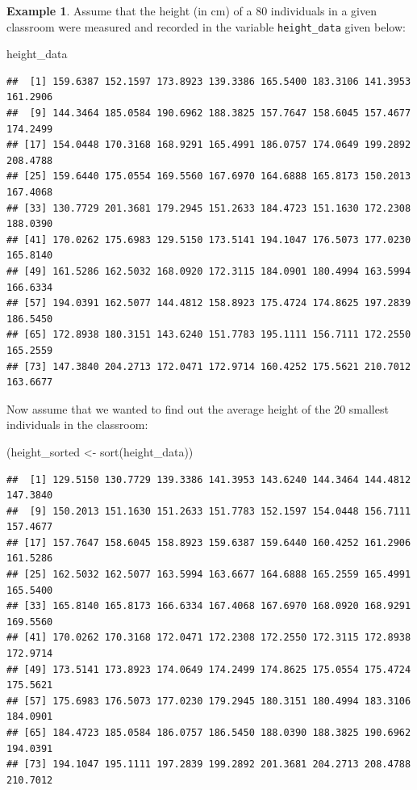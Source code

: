 \documentclass[
]{book}
\newenvironment{Shaded}{\begin{snugshade}}{\end{snugshade}}
\newcommand{\FunctionTok}[1]{\textcolor[rgb]{0.00,0.00,0.00}{#1}}
\newcommand{\NormalTok}[1]{#1}
\newcommand{\OtherTok}[1]{\textcolor[rgb]{0.56,0.35,0.01}{#1}}
\theoremstyle{definition}
\theoremstyle{definition}
\newtheorem{example}{Example}[chapter]
\theoremstyle{definition}
\theoremstyle{definition}
\theoremstyle{remark}
\begin{document}
\begin{example}

Assume that the height (in cm) of a 80 individuals in a given classroom were measured and recorded in the variable \texttt{height\_data} given below:

\begin{Shaded}
\begin{Highlighting}[]
\NormalTok{height\_data}
\end{Highlighting}
\end{Shaded}

\begin{verbatim}
##  [1] 159.6387 152.1597 173.8923 139.3386 165.5400 183.3106 141.3953 161.2906
##  [9] 144.3464 185.0584 190.6962 188.3825 157.7647 158.6045 157.4677 174.2499
## [17] 154.0448 170.3168 168.9291 165.4991 186.0757 174.0649 199.2892 208.4788
## [25] 159.6440 175.0554 169.5560 167.6970 164.6888 165.8173 150.2013 167.4068
## [33] 130.7729 201.3681 179.2945 151.2633 184.4723 151.1630 172.2308 188.0390
## [41] 170.0262 175.6983 129.5150 173.5141 194.1047 176.5073 177.0230 165.8140
## [49] 161.5286 162.5032 168.0920 172.3115 184.0901 180.4994 163.5994 166.6334
## [57] 194.0391 162.5077 144.4812 158.8923 175.4724 174.8625 197.2839 186.5450
## [65] 172.8938 180.3151 143.6240 151.7783 195.1111 156.7111 172.2550 165.2559
## [73] 147.3840 204.2713 172.0471 172.9714 160.4252 175.5621 210.7012 163.6677
\end{verbatim}

Now assume that we wanted to find out the average height of the 20 smallest individuals in the classroom:

\begin{Shaded}
\begin{Highlighting}[]
\NormalTok{(height\_sorted }\OtherTok{\textless{}{-}} \FunctionTok{sort}\NormalTok{(height\_data))}
\end{Highlighting}
\end{Shaded}

\begin{verbatim}
##  [1] 129.5150 130.7729 139.3386 141.3953 143.6240 144.3464 144.4812 147.3840
##  [9] 150.2013 151.1630 151.2633 151.7783 152.1597 154.0448 156.7111 157.4677
## [17] 157.7647 158.6045 158.8923 159.6387 159.6440 160.4252 161.2906 161.5286
## [25] 162.5032 162.5077 163.5994 163.6677 164.6888 165.2559 165.4991 165.5400
## [33] 165.8140 165.8173 166.6334 167.4068 167.6970 168.0920 168.9291 169.5560
## [41] 170.0262 170.3168 172.0471 172.2308 172.2550 172.3115 172.8938 172.9714
## [49] 173.5141 173.8923 174.0649 174.2499 174.8625 175.0554 175.4724 175.5621
## [57] 175.6983 176.5073 177.0230 179.2945 180.3151 180.4994 183.3106 184.0901
## [65] 184.4723 185.0584 186.0757 186.5450 188.0390 188.3825 190.6962 194.0391
## [73] 194.1047 195.1111 197.2839 199.2892 201.3681 204.2713 208.4788 210.7012
\end{verbatim}


\end{example}
\end{document}
